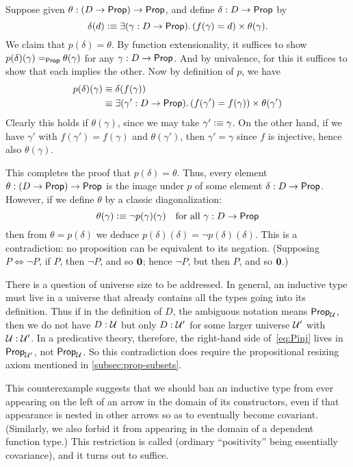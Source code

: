 Suppose given $\theta:(D\to\mathsf{Prop})\to\mathsf{Prop}$, and define $\delta:D\to\mathsf{Prop}$ by
\begin{equation}
  \delta(d) \defeq \exis{\gamma:D\to\prop} (f(\gamma) = d) \times \theta(\gamma).\label{eq:Pinj}
\end{equation}
We claim that $p(\delta)=\theta$.
By function extensionality, it suffices to show $p(\delta)(\gamma) =_\mathsf{Prop} \theta(\gamma)$ for any $\gamma:D\to\mathsf{Prop}$.
And by univalence, for this it suffices to show that each implies the other.
Now by definition of $p$, we have
\begin{align*}
  p(\delta)(\gamma) &\jdeq \delta(f(\gamma))\\
  &\jdeq \exis{\gamma':D\to\prop} (f(\gamma') = f(\gamma)) \times \theta(\gamma')
\end{align*}
Clearly this holds if $\theta(\gamma)$, since we may take $\gamma'\vcentcolon\equiv \gamma$.
On the other hand, if we have $\gamma'$ with $f(\gamma') = f(\gamma)$ and $\theta(\gamma')$, then $\gamma'=\gamma$ since $f$ is injective, hence also $\theta(\gamma)$.

This completes the proof that $p(\delta)=\theta$.
Thus, every element $\theta:(D\to\mathsf{Prop})\to\mathsf{Prop}$ is the image under $p$ of some element $\delta:D\to\mathsf{Prop}$.
However, if we define $\theta$ by a classic diagonalization:
\[ \theta(\gamma) \vcentcolon\equiv \neg p(\gamma)(\gamma) \quad\text{for all $\gamma:D\to\mathsf{Prop}$} \]
then from $\theta = p(\delta)$ we deduce $p(\delta)(\delta) = \neg p(\delta)(\delta)$.
This is a contradiction: no proposition can be equivalent to its negation.
(Supposing $P\Leftrightarrow \neg P$, if $P$, then $\neg P$, and so $\mathbf{0}$; hence $\neg P$, but then $P$, and so $\mathbf{0}$.)

\begin{rmk}
  There is a question of universe size to be addressed.
  In general, an inductive type must live in a universe that already contains all the types going into its definition.
  Thus if in the definition of $D$, the ambiguous notation \prop means $\mathsf{Prop}_{\mathcal{U}}$, then we do not have $D:\mathcal{U}$ but only $D:\mathcal{U}'$ for some larger universe $\mathcal{U}'$ with $\mathcal{U}:\mathcal{U}'$.
  In a predicative theory, therefore, the right-hand side of~\eqref{eq:Pinj} lives in $\mathsf{Prop}_{\mathcal{U}'}$, not $\mathsf{Prop}_\mathcal{U}$.
  So this contradiction does require the propositional resizing axiom
  mentioned in \autoref{subsec:prop-subsets}.
\end{rmk}

%
This counterexample suggests that we should ban an inductive type from ever appearing on the left of an arrow in the domain of its constructors, even if that appearance is nested in other arrows so as to eventually become covariant.
(Similarly, we also forbid it from appearing in the domain of a dependent function type.)
This restriction is called 
%
%
(ordinary ``positivity'' being essentially covariance), and it turns out to suffice.

